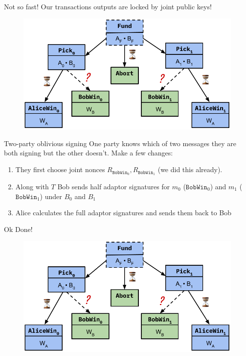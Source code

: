\documentclass{beamer}
\begin{document}
\begin{frame}
Not so fast! Our transactions outputs are locked by joint public keys!
    \begin{figure}
        \centering
        \includegraphics[width=\textwidth]{oblivious_signing_3.png}
    \end{figure}
\end{frame}


\begin{frame}{Two-party oblivious signing}
    One party knows which of two messages they are both signing but the other doesn't. Make a few changes:
    
    \begin{enumerate}
        \item They first choose joint nonces $R_{\texttt{BobWin}_0}, R_{\texttt{BobWin}_1}$ (we did this already).
        \item Along with $T$ Bob sends half adaptor signatures for $m_0$ ($\texttt{BobWin}_0$) and $m_1$ ($\texttt{BobWin}_1$) under $B_0$ and $B_1$
        \item Alice calculates the full adaptor signatures and sends them back to Bob
    \end{enumerate}
    
\end{frame}

\begin{frame}{Ok Done!}

    \begin{figure}
        \centering
        \includegraphics[width=\textwidth]{oblivious_signing_3.png}
    \end{figure}

\end{frame}
\end{document}
